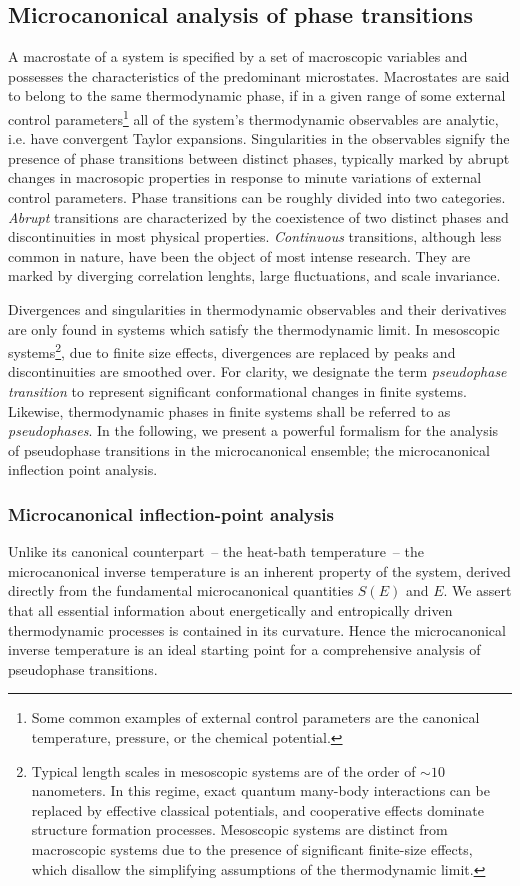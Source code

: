 \documentclass[12pt]{report}
\begin{document}
\subsection{Microcanonical analysis of phase transitions}
A macrostate of a system is specified by a set of macroscopic variables and possesses the characteristics of the predominant microstates. Macrostates are said to belong to the same thermodynamic phase, if in a given range of some external control parameters\footnote{Some common examples of external control parameters are the canonical temperature, pressure, or the chemical potential.} all of the system's thermodynamic observables are analytic, i.e. have convergent Taylor expansions. Singularities in the observables signify the presence of phase transitions between distinct phases, typically marked by abrupt changes in macrosopic properties in response to minute variations of external control parameters. Phase transitions can be roughly divided into two categories. \textit{Abrupt} transitions are characterized by the coexistence of two distinct phases and discontinuities in most physical properties. \textit{Continuous} transitions, although less common in nature, have been the object of most intense research. They are marked by diverging correlation lenghts, large fluctuations, and scale invariance. 

Divergences and singularities in thermodynamic observables and their derivatives are only found in systems which satisfy the thermodynamic limit. In mesoscopic systems\footnote{Typical length scales in  mesoscopic systems are of the order of $\sim 10$ nanometers. In this regime, exact quantum many-body interactions can be replaced by effective classical potentials, and cooperative effects dominate structure formation processes. Mesoscopic systems are distinct from macroscopic systems due to the presence of significant finite-size effects, which disallow the simplifying assumptions of the thermodynamic limit.}, due to finite size effects, divergences are replaced by peaks and discontinuities are smoothed over. For clarity, we designate the term \textit{pseudophase transition} to represent significant conformational changes in finite systems. Likewise, thermodynamic phases in finite systems shall be referred to as \textit{pseudophases}. In the following, we present a powerful formalism for the analysis of pseudophase transitions in the microcanonical ensemble; the microcanonical inflection point analysis.

\subsubsection{Microcanonical inflection-point analysis}
Unlike its canonical counterpart~-- the heat-bath temperature~-- the
microcanonical inverse temperature is an inherent property of the system, derived directly from the fundamental microcanonical quantities $S(E)$ and $E$. We assert that all essential information about energetically and entropically driven thermodynamic processes is contained in its curvature. Hence the microcanonical inverse temperature is an ideal starting point for a comprehensive analysis of pseudophase transitions.  
\end{document}
